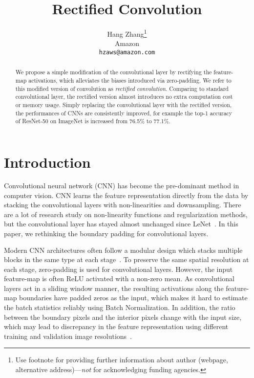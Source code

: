 \documentclass{article}
\title{Rectified Convolution}
\author{%
  Hang Zhang\thanks{Use footnote for providing further information
    about author (webpage, alternative address)---\emph{not} for acknowledging
    funding agencies.} \\
  Amazon \\
  \texttt{hzaws@amazon.com} \\
}
\begin{document}
\maketitle

\begin{abstract}
  
  We propose a simple modification of the convolutional layer by rectifying the feature-map activations, which alleviates the biases introduced via zero-padding. We refer to this modified version of convolution as {\em rectified convolution}. 
  Comparing to standard convolutional layer, the rectified version almost introduces no extra computation cost or memory usage. 
  Simply replacing the convolutional layer with the rectified version, the performances of CNNs are consistently improved, for example the top-1 accuracy of ResNet-50 on ImageNet is increased from 76.5\% to 77.1\%. %
  
  
\end{abstract}

\section{Introduction}


Convolutional neural network (CNN) has become the pre-dominant method in computer vision. 
CNN learns the feature representation directly from the data by stacking the convolutional layers with non-linearities and downsampling. 
There are a lot of research study on non-linearity functions and regularization methods, but the convolutional layer has stayed almost unchanged since LeNet~\cite{lecun1998gradient}. In this paper, we rethinking the boundary padding for convolutional layers. %


Modern CNN architectures often follow a modular design which stacks multiple blocks in the same type at each stage~\cite{simonyan2014very,he2015deep}. 
To preserve the same spatial resolution at each stage, zero-padding is used for convolutional layers. 
However, the input feature-map is often ReLU activated with a non-zero mean. 
As convolutional layers act in a sliding window manner, the resulting activations along the feature-map boundaries have padded zeros as the input, which makes it hard to estimate the batch statistics reliably using Batch Normalization. 
In addition, the ratio between the boundary pixels and the interior pixels change with the input size, which may lead to discrepancy in the feature representation using different training and validation image resolutions~\cite{touvron2019fixing}. 
\end{document}
